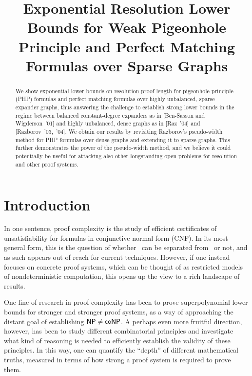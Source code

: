 \documentclass{theoretics}
\title{Exponential 
  Resolution
  Lower Bounds for Weak Pigeonhole Principle 
  and Perfect Matching Formulas over Sparse Graphs}
\newcommand{\complclassformat}[1]{\textrm{\upshape{\textsf{#1}}}\xspace}
\newcommand{\cocomplclass}[1]{\textrm{\upshape{\textsf{co#1}}}\xspace}
\newcommand{\NP}{\complclassformat{NP}}
\newcommand{\coNP}{\cocomplclass{NP}}
\numberwithin{equation}{section}
\begin{document}
\maketitle







\begin{abstract}
  We show exponential lower bounds on resolution proof length for
  pigeonhole principle (PHP) formulas and perfect matching formulas
  over highly unbalanced, sparse expander graphs, thus answering the
  challenge to establish strong lower bounds in the regime between
  balanced constant-degree expanders as in [Ben-Sasson and
  Wigderson~'01] and highly unbalanced, dense graphs as in [Raz~'04]
  and [Razborov~'03,~'04].  We obtain our results by revisiting
  Razborov's pseudo-width method for PHP formulas over dense graphs
  and extending it to sparse graphs. This further demonstrates the
  power of the pseudo-width method, and we believe it could
  potentially be useful for attacking also other longstanding open
  problems for resolution and other proof systems.
\end{abstract}

\section{Introduction}
\label{sec:intro}

In one sentence, 
proof complexity 
is the study
of efficient certificates of unsatisfiability for formulas in
conjunctive normal form (CNF).  In its most general form, this is the
question of whether \coNP~can be separated from \NP~or not, and as
such appears out of reach for current techniques. 
However, if one instead focuses on concrete proof systems, which can
be thought of as restricted models of nondeterministic computation,
this opens up the view to a rich landscape of results.

One line of research in proof complexity has been to prove
superpolynomial lower bounds for stronger and stronger proof systems,
as a way of approaching 
the distant goal of establishing
$\NP \neq \coNP$. 
A perhaps even more fruitful direction, however, has been to study
different combinatorial principles and investigate what kind of
reasoning is needed to efficiently establish the validity of these
principles.  In this way, one can quantify the ``depth'' of
different mathematical truths, measured in terms of how strong a proof
system is required to prove them.
\end{document}
